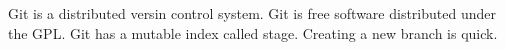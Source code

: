 ﻿Git is a distributed  versin control system.
Git is free software distributed under the GPL.
Git has a mutable index called stage.
Creating a new branch is quick.